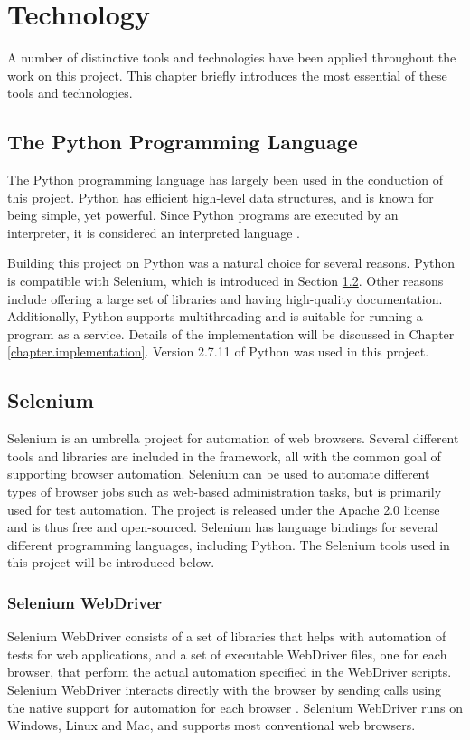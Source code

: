 \section{Technology}\label{chapter.technology}
\thispagestyle{plain}
A number of distinctive tools and technologies have been applied throughout the work on this project. This chapter briefly introduces the most essential of these tools and technologies.%

\subsection{The Python Programming Language}
The Python programming language has largely been used in the conduction of this project. Python has efficient high-level data structures, and is known for being simple, yet powerful. Since Python programs are executed by an interpreter, it is considered an interpreted language \cite{abyteofpython}.

Building this project on Python was a natural choice for several reasons. Python is compatible with Selenium, which is introduced in Section \ref{subsec.selenium}. Other reasons include offering a large set of libraries and having high-quality documentation. Additionally, Python supports multithreading and is suitable for running a program as a service. Details of the implementation will be discussed in Chapter \ref{chapter.implementation}. Version 2.7.11 of Python was used in this project.


\subsection{Selenium}\label{subsec.selenium}
Selenium is an umbrella project for automation of web browsers. Several different tools and libraries are included in the framework, all with the common goal of supporting browser automation. Selenium can be used to automate different types of browser jobs such as web-based administration tasks, but is primarily  used for test automation. The project is released under the Apache 2.0 license and is thus free and open-sourced. Selenium has language bindings for several different programming languages, including Python. The Selenium tools used in this project will be introduced below. %

\subsubsection{Selenium WebDriver}
Selenium WebDriver consists of a set of libraries that helps with automation of tests for web applications, and a set of executable WebDriver files, one for each browser, that perform the actual automation specified in the WebDriver scripts. Selenium WebDriver interacts directly with the browser by sending calls using the native support for automation for each browser \cite{selDocWebDriver}. Selenium WebDriver runs on Windows, Linux and Mac, and supports most conventional web browsers.

